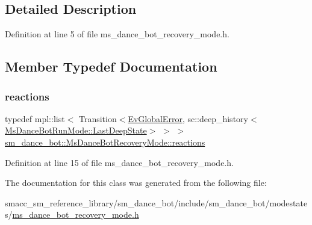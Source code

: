 \subsection{Detailed Description}


Definition at line 5 of file ms\+\_\+dance\+\_\+bot\+\_\+recovery\+\_\+mode.\+h.



\subsection{Member Typedef Documentation}
\mbox{\label{classsm__dance__bot_1_1MsDanceBotRecoveryMode_a2dbd831e931d432508707aa9fcd18529}} 
\subsubsection{\texorpdfstring{reactions}{reactions}}
{\footnotesize\ttfamily typedef mpl\+::list$<$ Transition$<$\hyperlink{structsm__dance__bot_1_1EvGlobalError}{Ev\+Global\+Error}, sc\+::deep\+\_\+history$<$\hyperlink{classsmacc_1_1SmaccState_a60088405d2d99d468caa0baa3b2830a8}{Ms\+Dance\+Bot\+Run\+Mode\+::\+Last\+Deep\+State}$>$ $>$ $>$ \hyperlink{classsm__dance__bot_1_1MsDanceBotRecoveryMode_a2dbd831e931d432508707aa9fcd18529}{sm\+\_\+dance\+\_\+bot\+::\+Ms\+Dance\+Bot\+Recovery\+Mode\+::reactions}}



Definition at line 15 of file ms\+\_\+dance\+\_\+bot\+\_\+recovery\+\_\+mode.\+h.



The documentation for this class was generated from the following file\+:\begin{DoxyCompactItemize}
\item 
smacc\+\_\+sm\+\_\+reference\+\_\+library/sm\+\_\+dance\+\_\+bot/include/sm\+\_\+dance\+\_\+bot/modestates/\hyperlink{sm__dance__bot_2include_2sm__dance__bot_2modestates_2ms__dance__bot__recovery__mode_8h}{ms\+\_\+dance\+\_\+bot\+\_\+recovery\+\_\+mode.\+h}\end{DoxyCompactItemize}
